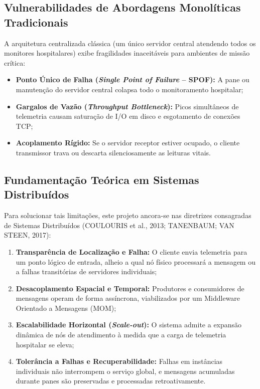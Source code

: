 \documentclass[12pt,a4paper]{article}
\begin{document}
\subsection{Vulnerabilidades de Abordagens Monolíticas Tradicionais}
A arquitetura centralizada clássica (um único servidor central atendendo todos os monitores hospitalares) exibe fragilidades inaceitáveis para ambientes de missão crítica:
\begin{itemize}
	\item \textbf{Ponto Único de Falha (\textit{Single Point of Failure} -- SPOF):} A pane ou manutenção do servidor central colapsa todo o monitoramento hospitalar;
	\item \textbf{Gargalos de Vazão (\textit{Throughput Bottleneck}):} Picos simultâneos de telemetria causam saturação de I/O em disco e esgotamento de conexões TCP;
	\item \textbf{Acoplamento Rígido:} Se o servidor receptor estiver ocupado, o cliente transmissor trava ou descarta silenciosamente as leituras vitais.
\end{itemize}

\subsection{Fundamentação Teórica em Sistemas Distribuídos}
Para solucionar tais limitações, este projeto ancora-se nas diretrizes consagradas de Sistemas Distribuídos (COULOURIS et al., 2013; TANENBAUM; VAN STEEN, 2017):
\begin{enumerate}
	\item \textbf{Transparência de Localização e Falha:} O cliente envia telemetria para um ponto lógico de entrada, alheio a qual nó físico processará a mensagem ou a falhas transitórias de servidores individuais;
	\item \textbf{Desacoplamento Espacial e Temporal:} Produtores e consumidores de mensagens operam de forma assíncrona, viabilizados por um Middleware Orientado a Mensagens (MOM);
	\item \textbf{Escalabilidade Horizontal (\textit{Scale-out}):} O sistema admite a expansão dinâmica de nós de atendimento à medida que a carga de telemetria hospitalar se eleva;
	\item \textbf{Tolerância a Falhas e Recuperabilidade:} Falhas em instâncias individuais não interrompem o serviço global, e mensagens acumuladas durante panes são preservadas e processadas retroativamente.
\end{enumerate}
\end{document}
